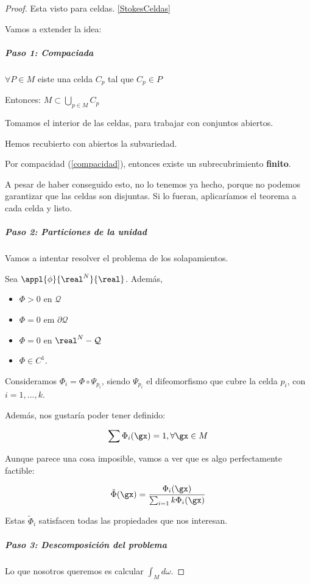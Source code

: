 \begin{proof}
Esta visto para celdas.
\ref{StokesCeldas}

Vamos a extender la idea:


\subparagraph{Paso 1: Compaciada}
$\forall P\in M$ eiste una celda $C_p$ tal que $C_p\in P$

Entonces: $M\subset \displaystyle\bigcup_{p\in M} C_p$

Tomamos el interior de las celdas, para trabajar con conjuntos abiertos.

Hemos recubierto con abiertos la subvariedad.

Por compacidad (\ref{compacidad}), entonces existe un subrecubrimiento \textbf{finito}.

A pesar de haber conseguido esto, no lo tenemos ya hecho, porque no podemos garantizar que las celdas son disjuntas. Si lo fueran, aplicaríamos el teorema a cada celda y listo.

\subparagraph{Paso 2: Particiones de la unidad}

Vamos a intentar resolver el problema de los solapamientos.

Sea $\appl{\phi}{\real^N}{\real}$. Además, 
\begin{itemize}
\item $\Phi>0$ en $\mathcal{Q}$
\item $\Phi = 0$ em $\partial  \mathcal{Q}$
\item $\Phi = 0$ en $\real^N-\mathcal{Q}$
\item $\Phi\in C^1$.
\end{itemize}

Consideramos $\Phi_i = \Phi\circ\Psi_{p_i}$, siendo $\Psi_{p_i}$ el difeomorfismo que cubre la celda $p_i$, con $i=1,...,k$.

Además, nos gustaría poder tener definido:

\[\displaystyle \sum \Phi_{i}(\gx) = 1,\forall \gx \in M\]

Aunque parece una cosa imposible, vamos a ver que es algo perfectamente factible:

\[\tilde{\Phi}(\gx) = \frac{\Phi_i (\gx)}{\sum_{i=1}{k}\Phi_i(\gx)}\]

Estas $\tilde{\Phi}_i$ satisfacen todas las propiedades que nos interesan.

\subparagraph{Paso 3: Descomposición del problema}

Lo que nosotros queremos es calcular $\int_M d\omega$.



\end{proof}
